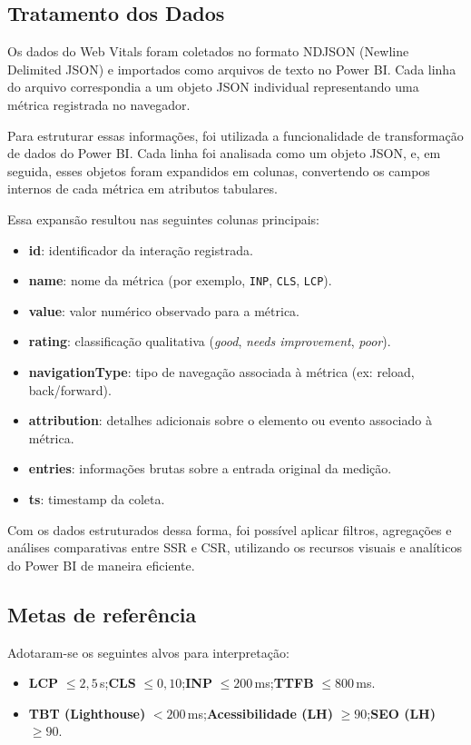 \subsection{Tratamento dos Dados}
Os dados do Web Vitals foram coletados no formato NDJSON (Newline Delimited JSON) e importados como arquivos de texto no Power BI. Cada linha do arquivo correspondia a um objeto JSON individual representando uma métrica registrada no navegador.

Para estruturar essas informações, foi utilizada a funcionalidade de transformação de dados do Power BI. Cada linha foi analisada como um objeto JSON, e, em seguida, esses objetos foram expandidos em colunas, convertendo os campos internos de cada métrica em atributos tabulares.

Essa expansão resultou nas seguintes colunas principais:

\begin{itemize}
    \item \textbf{id}: identificador da interação registrada.
    \item \textbf{name}: nome da métrica (por exemplo, \texttt{INP}, \texttt{CLS}, \texttt{LCP}).
    \item \textbf{value}: valor numérico observado para a métrica.
    \item \textbf{rating}: classificação qualitativa (\textit{good}, \textit{needs improvement}, \textit{poor}).
    \item \textbf{navigationType}: tipo de navegação associada à métrica (ex: reload, back/forward).
    \item \textbf{attribution}: detalhes adicionais sobre o elemento ou evento associado à métrica.
    \item \textbf{entries}: informações brutas sobre a entrada original da medição.
    \item \textbf{ts}: timestamp da coleta.
\end{itemize}

Com os dados estruturados dessa forma, foi possível aplicar filtros, agregações e análises comparativas entre SSR e CSR, utilizando os recursos visuais e analíticos do Power BI de maneira eficiente.

\subsection{Metas de referência}
Adotaram-se os seguintes alvos para interpretação:
\begin{itemize}
    \item \textbf{LCP} $\leq 2{,}5$\,s;\quad \textbf{CLS} $\leq 0{,}10$;\quad \textbf{INP} $\leq 200$\,ms;\quad \textbf{TTFB} $\leq 800$\,ms.
    \item \textbf{TBT (Lighthouse)} $<200$\,ms;\quad \textbf{Acessibilidade (LH)} $\geq 90$;\quad \textbf{SEO (LH)} $\geq 90$.
\end{itemize}

